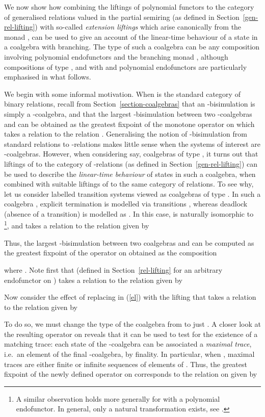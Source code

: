\documentclass[submission,copyright,creativecommons]{eptcs}
\theoremstyle{plain}\newtheorem{theorem}{Theorem}[section]
\theoremstyle{remark}
\begin{document}
We now show how combining the liftings of polynomial functors to the category of generalised relations valued in the partial semiring  (as defined in Section~\ref{gen-rel-lifting}) with so-called \emph{extension liftings} which arise canonically from the monad , can be used to give an account of the linear-time behaviour of a state in a coalgebra with branching. The type of such a coalgebra can be any composition involving polynomial endofunctors and the branching monad , although compositions of type ,  and  with  and  polynomial endofunctors are particularly emphasised in what follows.

We begin with some informal motivation. When  is the standard category of binary relations, recall from Section~\ref{section-coalgebras} that an -bisimulation is simply a -coalgebra, and that the largest -bisimulation between two -coalgebras  and  can be obtained as the greatest fixpoint of the monotone operator  on  which takes a relation  to the relation . Generalising the notion of -bisimulation from standard relations to -relations makes little sense when the systems of interest are -coalgebras. However, when considering say, coalgebras of type , it turns out that liftings of  to the category of -relations (as defined in Section~\ref{gen-rel-lifting}) can be used to describe the \emph{linear-time behaviour} of states in such a coalgebra, when combined with suitable liftings of  to the same category of relations. To see why, let us consider labelled transition systems viewed as coalgebras of type . In such a coalgebra , explicit termination is modelled via transitions , whereas deadlock (absence of a transition) is modelled as . In this case,  is naturally isomorphic to \,\footnote{A similar observation holds more generally for  with  a polynomial endofunctor. In general, only a natural transformation  exists, see \cite[Exercise~4.4.6]{JacobsBook}.}, and takes a relation  to the relation  given by

Thus, the largest -bisimulation between two coalgebras  and  can be computed as the greatest fixpoint of the operator on  obtained as the composition

where . Note first that  (defined in Section~\ref{rel-lifting} for an arbitrary endofunctor on ) takes a relation  to the relation  given by

Now consider the effect of replacing  in (\ref{el}) with the lifting  that takes a relation  to the relation  given by

To do so, we must change the type of the coalgebra  from  to just . A closer look at the resulting operator on  reveals that it can be used to test for the existence of a matching trace: each state of the -coalgebra  can be associated a \emph{maximal trace}, i.e.~an element of the final -coalgebra, by finality. In particular, when , maximal traces are either finite or infinite sequences of elements of . Thus, the greatest fixpoint of the newly defined operator on  corresponds to the relation on  given by
\end{document}

